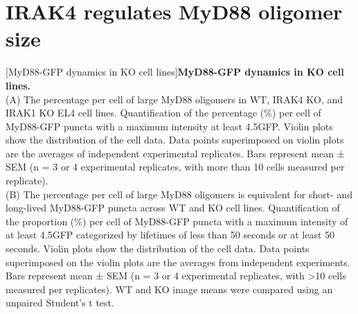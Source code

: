 \section{IRAK4 regulates MyD88 oligomer size}
\begin{centering}
\captionsetup{parbox=none}
[MyD88-GFP dynamics in KO cell lines]{\textbf{MyD88-GFP dynamics in KO cell lines.}
\vspace{1em}
\\
(A) The percentage per cell of large MyD88 oligomers in WT, IRAK4 KO, and IRAK1 KO EL4 cell lines. Quantification of the percentage (\%) per cell of MyD88-GFP puncta with a maximum intensity at least 4.5\times GFP. Violin plots show the distribution of the cell data. Data points superimposed on violin plots are the averages of independent experimental replicates. Bars represent mean ± SEM (n = 3 or 4 experimental replicates, with more than 10 cells measured per replicate).
\vspace{1em}
\\
(B) The percentage per cell of large MyD88 oligomers is equivalent for short- and long-lived MyD88-GFP puncta across WT and KO cell lines. Quantification of the proportion (\%) per cell of MyD88-GFP puncta with a maximum intensity of at least 4.5\times GFP categorized by lifetimes of less than 50 seconds or at least 50 seconds. Violin plots show the distribution of the cell data. Data points superimposed on the violin plots are the averages from independent experiments. Bars represent mean ± SEM (n = 3 or 4 experimental replicates, with >10 cells measured per replicates). WT and KO image means were compared using an unpaired Student's t test.
}
\end{centering}
